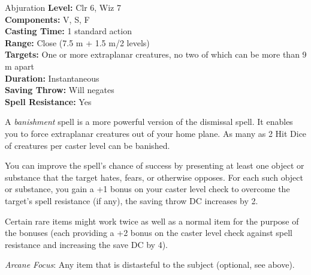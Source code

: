 {Abjuration}
{
	\textbf{Level:}
	Clr 6, Wiz 7\\
	\textbf{Components:}
	V, S, F\\
	\textbf{Casting Time:}
	1 standard action\\
	\textbf{Range:}
	Close (7.5 m + 1.5 m/2 levels)\\
	\textbf{Targets:}
	One or more extraplanar creatures, no two of which can be more than 9 m apart\\
	\textbf{Duration:}
	Instantaneous\\
	\textbf{Saving Throw:}
	Will negates\\
	\textbf{Spell Resistance:}
	Yes\\
}
{
	A \emph{banishment} spell is a more powerful version of the dismissal spell. It enables you to force extraplanar creatures out of your home plane. As many as 2 Hit Dice of creatures per caster level can be banished.

	You can improve the spell's chance of success by presenting at least one object or substance that the target hates, fears, or otherwise opposes. For each such object or substance, you gain a +1 bonus on your caster level check to overcome the target's spell resistance (if any), the saving throw DC increases by 2.

	Certain rare items might work twice as well as a normal item for the purpose of the bonuses (each providing a +2 bonus on the caster level check against spell resistance and increasing the save DC by 4).

	\textit{Arcane Focus}:
	Any item that is distasteful to the subject (optional, see above).

}
